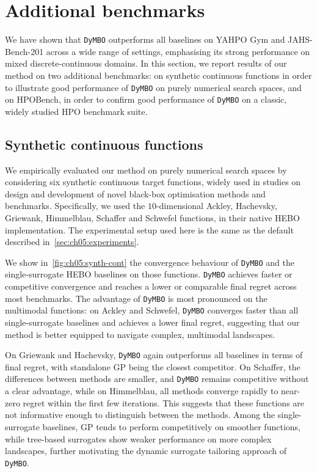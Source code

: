 \section{Additional benchmarks}
\label{sec:ch05:add-bench}

We have shown that \texttt{DyMBO} outperforms all baselines on YAHPO Gym and JAHS-Bench-201 across a wide range of settings, emphasising its strong performance on mixed discrete-continuous domains.
In this section, we report results of our method on two additional benchmarks: on synthetic continuous functions in order to illustrate good performance of \texttt{DyMBO} on purely numerical search spaces, and on HPOBench, in order to confirm good performance of \texttt{DyMBO} on a classic, widely studied HPO benchmark suite.

\subsection{Synthetic continuous functions}
\label{sec:ch05:synth-cont-func}

We empirically evaluated our method on purely numerical search spaces by considering six synthetic continuous target functions, widely used in studies on design and development of novel black-box optimisation methods and benchmarks.
Specifically, we used the $10$-dimensional Ackley, Hachevsky, Griewank, Himmelblau, Schaffer and Schwefel functions, in their native HEBO implementation.
The experimental setup used here is the same as the default described in~\cref{sec:ch05:experiments}.

We show in~\cref{fig:ch05:synth-cont} the convergence behaviour of \texttt{DyMBO} and the single-surrogate HEBO baselines on those functions.
\texttt{DyMBO} achieves faster or competitive convergence and reaches a lower or comparable final regret across most benchmarks.
The advantage of \texttt{DyMBO} is most pronounced on the multimodal functions: on Ackley and Schwefel, \texttt{DyMBO} converges faster than all single-surrogate baselines and achieves a lower final regret, suggesting that our method is better equipped to navigate complex, multimodal landscapes.

On Griewank and Hachevsky, \texttt{DyMBO} again outperforms all baselines in terms of final regret, with standalone GP being the closest competitor.
On Schaffer, the differences between methods are smaller, and \texttt{DyMBO} remains competitive without a clear advantage, while on Himmelblau, all methods converge rapidly to near-zero regret within the first few iterations.
This suggests that these functions are not informative enough to distinguish between the methods.
Among the single-surrogate baselines, GP tends to perform competitively on smoother functions, while tree-based surrogates show weaker performance on more complex landscapes, further motivating the dynamic surrogate tailoring approach of \texttt{DyMBO}.


